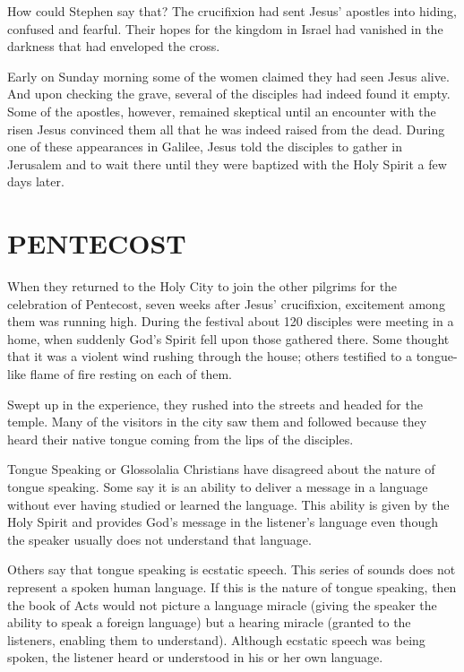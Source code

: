How could Stephen say that? The crucifixion had sent Jesus’ apostles into hiding, confused and
fearful. Their hopes for the kingdom in Israel had vanished in the darkness that had enveloped the
cross.

Early on Sunday morning some of the women claimed they had seen Jesus alive. And upon checking the
grave, several of the disciples had indeed found it empty. Some of the apostles, however, remained
skeptical until an encounter with the risen Jesus convinced them all that he was indeed raised from
the dead. During one of these appearances in Galilee, Jesus told the disciples to gather in
Jerusalem and to wait there until they were baptized with the Holy Spirit a few days later.

\section{PENTECOST}

When they returned to the Holy City to join the other pilgrims for the celebration of Pentecost,
seven weeks after Jesus’ crucifixion, excitement among them was running high. During the festival
about 120 disciples were meeting in a home, when suddenly God’s Spirit fell upon those gathered
there. Some thought that it was a violent wind rushing through the house; others testified to a
tongue-like flame of fire resting on each of them.

Swept up in the experience, they rushed into the streets and headed for the temple. Many of the
visitors in the city saw them and followed because they heard their native tongue coming from the
lips of the disciples.

\begin{sidebar}{Tongue Speaking or Glossolalia}
Christians have disagreed about the nature of tongue speaking. Some say it is an ability to deliver
a message in a language without ever having studied or learned the language. This ability is given
by the Holy Spirit and provides God’s message in the listener’s language even though the speaker
usually does not understand that language.

Others say that tongue speaking is ecstatic speech. This series of sounds does not represent a
spoken human language. If this is the nature of tongue speaking, then the book of Acts would not
picture a language miracle (giving the speaker the ability to speak a foreign language) but a
hearing miracle (granted to the listeners, enabling them to understand). Although ecstatic speech
was being spoken, the listener heard or understood in his or her own language.
\end{sidebar}

